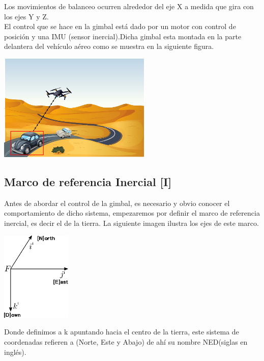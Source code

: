 Los movimientos de balanceo ocurren alrededor del eje X a medida que gira con los ejes Y y Z.\\
El control que se hace en la gimbal está dado por un motor con control de posición y una IMU (sensor inercial).Dicha gimbal esta
montada en la parte delantera del vehículo aéreo como se muestra en la siguiente figura.
\begin{center}
	\includegraphics[width=0.55\textwidth]{Contenido/Cuerpo/Capitulo3/Fig2.eps}
	\label{fig:ModeloMat:Fig1}
\end{center}

\subsection{Marco de referencia Inercial [I]}
Antes de abordar el control de la gimbal, es necesario y obvio conocer el comportamiento
de dicho sistema, empezaremos por definir el marco de referencia inercial, es decir
el de la tierra. La siguiente imagen ilustra los ejes de este marco.
\begin{center}
	\includegraphics[width=0.25\textwidth]{Contenido/Cuerpo/Capitulo3/Fig4.eps}
	\label{fig:ModeloMat:Fig1}
\end{center}
Donde definimos a k apuntando hacia el centro de la tierra, este sistema de coordenadas
refieren a (Norte, Este y Abajo) de ahí su nombre NED(siglas en inglés).

